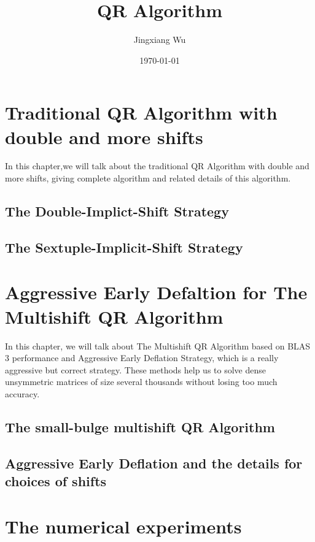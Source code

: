 \documentclass[UTF8]{report}
\title{\Huge \textbf{QR Algorithm}}
\author{Jingxiang Wu}
\date{\today}
\begin{document}
\large
\maketitle
\tableofcontents
\chapter{Traditional QR Algorithm with double and more shifts}

In this chapter,we will talk about the traditional QR Algorithm with double and more shifts, giving complete algorithm and related details of this algorithm.
\section{The Double-Implict-Shift Strategy}

\section{The Sextuple-Implicit-Shift Strategy}

\chapter{Aggressive Early Defaltion for The Multishift QR Algorithm}
In this chapter, we will talk about The Multishift QR Algorithm based on BLAS 3 performance and Aggressive Early Deflation Strategy, which is a really aggressive but correct strategy. These methods help us to solve dense unsymmetric matrices of size several thousands without losing too much accuracy.
\section{The small-bulge multishift QR Algorithm}\cite{MQRC}

\section{Aggressive Early Deflation and the details for choices of shifts}\cite{AED}

\chapter{The numerical experiments}

\begin{appendix}

\end{appendix}


\end{document}
